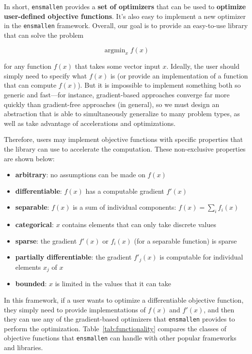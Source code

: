 \documentclass{article}
\begin{document}
In short, {\tt ensmallen} provides a {\bf set of optimizers} that can be used to
{\bf optimize user-defined objective functions}.  It's also easy to implement a
new optimizer in the {\tt ensmallen} framework.  Overall, our goal is to provide
an easy-to-use library that can solve the problem

\begin{equation}
\operatorname{argmin}_{x} f(x)
\end{equation}

\noindent for any function $f(x)$ that takes some vector input $x$.  Ideally,
the user should simply need to specify what $f(x)$ is (or provide an
implementation of a function that can compute $f(x)$).  But it is impossible to
implement something both so generic and fast---for instance, gradient-based
approaches converge far more quickly than gradient-free approaches (in general),
so we must design an abstraction that is able to simultaneously generalize to
many problem types, as well as take advantage of accelerations and
optimizations.

Therefore, users may implement objective functions with specific properties that
the library can use to accelerate the computation.  These non-exclusive
properties are shown below:

\begin{itemize}
  \item {\bf arbitrary}: no assumptions can be made on $f(x)$
  \item {\bf differentiable}: $f(x)$ has a computable gradient $f'(x)$
  \item {\bf separable}: $f(x)$ is a sum of individual components: $f(x) =
\sum_{i} f_i(x)$
  \item {\bf categorical}: $x$ contains elements that can only take discrete
values
  \item {\bf sparse}: the gradient $f'(x)$ or $f_i(x)$ (for a separable
function) is sparse
  \item {\bf partially differentiable}: the gradient $f'_j(x)$ is computable for
individual elements $x_j$ of $x$
  \item {\bf bounded}: $x$ is limited in the values that it can take
\end{itemize}

In this framework, if a user wants to optimize a differentiable objective
function, they simply need to provide implementations of $f(x)$ and $f'(x)$, and
then they can use any of the gradient-based optimizers that {\tt ensmallen}
provides to perform the optimization.  Table~\ref{tab:functionality} compares
the classes of objective functions that {\tt ensmallen} can handle with other
popular frameworks and libraries.
\end{document}

